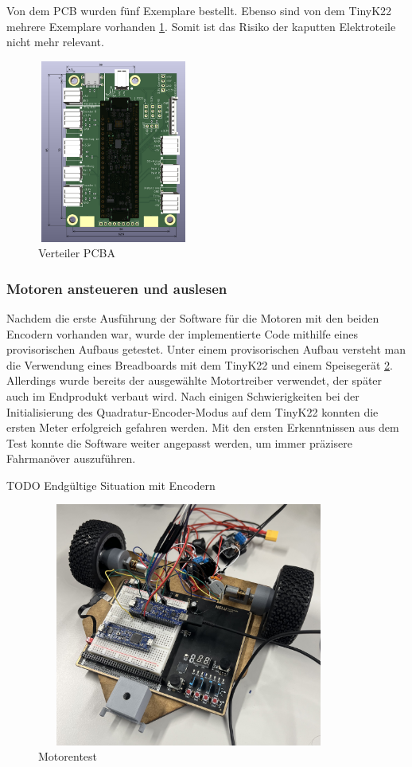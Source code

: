 Von dem PCB wurden fünf Exemplare bestellt. Ebenso sind von dem TinyK22 mehrere Exemplare vorhanden \ref{fig: Verteiler PCBA}. Somit ist das Risiko der kaputten Elektroteile nicht mehr relevant.

\begin{figure}[H]
\centering
\includegraphics[width=5cm, height=6cm]{assets/ET/PCB/VerteilerPCB_bestueckt.png}
\caption{Verteiler PCBA}
\label{fig: Verteiler PCBA}
\end{figure}


\subsubsection{Motoren ansteueren und auslesen}

Nachdem die erste Ausführung der Software für die Motoren mit den beiden Encodern vorhanden war, wurde der implementierte Code mithilfe eines provisorischen Aufbaus getestet. Unter einem provisorischen Aufbau versteht man die Verwendung eines Breadboards mit dem TinyK22 und einem Speisegerät \ref{fig: Motorentest}. Allerdings wurde bereits der ausgewählte Motortreiber verwendet, der später auch im Endprodukt verbaut wird. Nach einigen Schwierigkeiten bei der Initialisierung des Quadratur-Encoder-Modus auf dem TinyK22 konnten die ersten Meter erfolgreich gefahren werden. Mit den ersten Erkenntnissen aus dem Test konnte die Software weiter angepasst werden, um immer präzisere Fahrmanöver auszuführen.

TODO Endgültige Situation mit Encodern


\begin{figure}[H]
\centering
\includegraphics[width=10cm, height=8cm]{assets/ET/Motoren/Motorentest.jpeg}
\caption{Motorentest}
\label{fig: Motorentest}
\end{figure}

